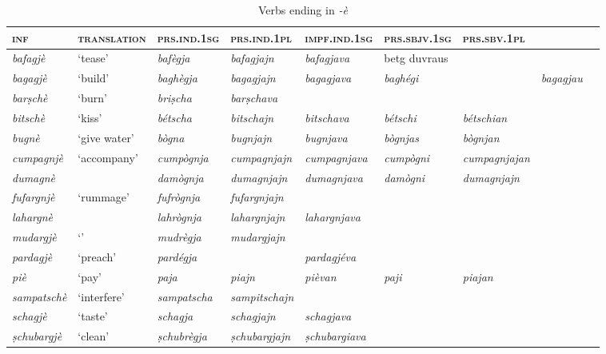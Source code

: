 \begin{sidewaystable} 
	\caption{Verbs ending in \textit{-è}}
	\label{}
	\begin{tabularx}{\textwidth}{lllllllll} 
		\lsptoprule
		 \textsc{\textbf{inf}} & \textsc{\textbf{translation}} & \textsc{\textbf{prs.ind.1sg}} & \textsc{\textbf{prs.ind.1pl}} & \textsc{\textbf{impf.ind.1sg}} & \textsc{\textbf{prs.sbjv.1sg}} & \textsc{\textbf{prs.sbv.1pl}} \\
		\midrule
		\textit{bafagjè} & ‘tease’ & \textit{bafègja} & \textit{bafagjajn} & \textit{bafagjava} &betg duvraus & \\
	\textit{bagagjè} & ‘build’ & \textit{baghègja} & \textit{bagagjajn} & \textit{bagagjava} & \textit{baghégi} & & \textit{bagagjau} \\
	\textit{barṣchè} & ‘burn’ & \textit{briṣcha} & \textit{barṣchava} \\
	\textit{bitschè} & ‘kiss’ & \textit{bétscha} & \textit{bitschajn} & \textit{bitschava} & \textit{bétschi} & \textit{bétschian}\\ 
	\textit{bugnè} & ‘give water’ & \textit{bògna} & \textit{bugnjajn} & \textit{bugnjava} & \textit{bògnjas} & \textit{bògnjan}\\
	\textit{cumpagnjè} & ‘accompany’ & \textit{cumpògnja} & \textit{cumpagnjajn} & \textit{cumpagnjava} & \textit{cumpògni} & \textit{cumpagnjajan}\\
	\textit{dumagnè} & & \textit{damògnja} & \textit{dumagnjajn} & \textit{dumagnjava} & \textit{damògni} & \textit{dumagnjajn}\\
	\textit{fufargnjè} & ‘rummage’ & \textit{fufrògnja} & \textit{fufargnjajn}\\
	\textit{lahargnè} & & \textit{lahrògnja} & \textit{lahargnjajn}& \textit{lahargnjava}\\
	\textit{mudargjè} & `' & \textit{mudrègja} & \textit{mudargjajn} & & \\
	\textit{pardagjè} & ‘preach’ & \textit{pardégja} & & \textit{pardagjéva} \\
	\textit{piè} & ‘pay’ & \textit{paja} & \textit{piajn} & \textit{pièvan} & \textit{paji} & \textit{piajan}\\
	\textit{sampatschè} & ‘interfere’ & \textit{sampatscha} & \textit{sampitschajn} & \\ 
	\textit{schagjè} & `taste' & \textit{schagja} & \textit{schagjajn} & \textit{schagjava} & \\
	\textit{ṣchubargjè} & `clean' & \textit{ṣchubrègja} & \textit{ṣchubargjajn} & \textit{ṣchubargiava}\\

\end{tabularx}
\end{sidewaystable}
